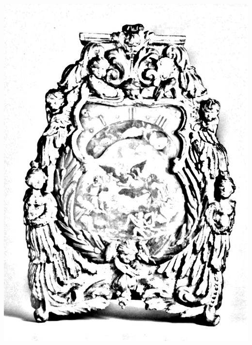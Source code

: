 \documentclass[hidelinks,12pt,a4paper]{article}
\begin{document}
\begin{adjustwidth}{-30mm}{-30mm}
			\thispagestyle{empty}
			\begin{minipage}{0.91\linewidth}
				\centering
				\includegraphics[scale=0.6]{Orologio_notturno.jpg}
			\end{minipage}
			
			\vspace*{\fill}
			\newpage
			

\end{adjustwidth}
\end{document}
